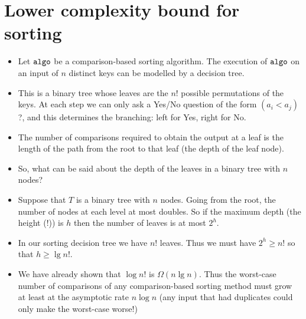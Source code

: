 \chapter{Lower complexity bound for sorting} %
\label{sec:lowerbound}

\begin{itemize}
\item Let $\operatorname{\text{\texttt{algo}}}$ be a comparison-based sorting algorithm. The execution
of $\operatorname{\text{\texttt{algo}}}$ on an input of $n$ distinct keys can be modelled by a
\alert{decision tree}. 
\item This is a binary tree whose leaves are the
$n!$ possible permutations of the keys. At each step we can only ask a Yes/No 
question of the form $(a_i < a_j)$?, and this determines the branching: left for
 Yes, right for No.
\item The number of comparisons required to obtain the output at a leaf is the 
length of the path from the root to that leaf (the \alert{depth} of the leaf 
node).
\item So, what can be said about the depth of the leaves in a binary tree with 
$n$ nodes?
\end{itemize}





\begin{itemize}
\item Suppose that $T$ is a binary tree with $n$ nodes. Going from the root, the
 number of nodes at each level at most doubles. So if the maximum depth (the 
 \alert{height} (!)) is $h$ then the number of leaves is at most $2^h$.
\item In our sorting decision tree we have $n!$ leaves. Thus we must have $2^h 
\geq n!$ so that $h \geq \lg n!$. 
\item We have already shown that $\log n!$ is $\Omega (n \lg n)$. Thus the 
worst-case number of comparisons of any comparison-based sorting method must 
grow at least at the asymptotic rate $n \log n$ (any input that had duplicates 
could only make the worst-case worse!)
\end{itemize}

